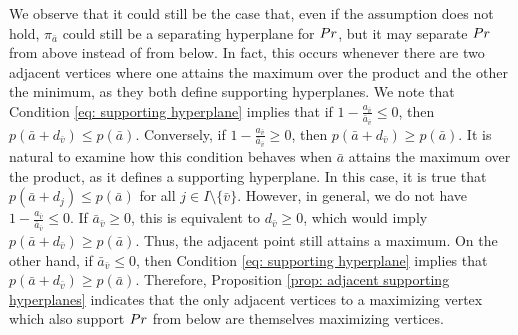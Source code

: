 \documentclass{article}
\begin{document}
We observe that it could still be the case that, even if the assumption does not hold, \(\pi_{\bar{a}}\) could still be a separating hyperplane for \(Pr\), but it may separate \(Pr\) from above instead of from below. In fact, this occurs whenever there are two adjacent vertices where one attains the maximum over the product and the other the minimum, as they both define supporting hyperplanes.
%
We note that Condition \eqref{eq: supporting hyperplane} implies that if \(1 - \frac{a_{\bar{v}}}{\bar{a}_{\bar{v}}} \leq 0\), then \(p(\bar{a} + d_{\bar{v}}) \leq p(\bar{a})\). Conversely, if \(1 - \frac{a_{\bar{v}}}{\bar{a}_{\bar{v}}} \geq 0\), then \(p(\bar{a} + d_{\bar{v}}) \geq p(\bar{a})\).
%
It is natural to examine how this condition behaves when \(\bar{a}\) attains the maximum over the product, as it defines a supporting hyperplane. In this case, it is true that \(p(\bar{a} + d_j) \leq p(\bar{a})\) for all \(j \in I \setminus \{\bar{v}\}\). However, in general, we do not have \(1 - \frac{a_{\bar{v}}}{\bar{a}_{\bar{v}}} \leq 0\). If \(\bar{a}_{\bar{v}} \geq 0\), this is equivalent to \(d_{\bar{v}} \geq 0\), which would imply \(p(\bar{a} + d_{\bar{v}}) \geq p(\bar{a})\). Thus, the adjacent point still attains a maximum.
%
On the other hand, if \(\bar{a}_{\bar{v}} \leq 0\), then Condition \eqref{eq: supporting hyperplane} implies that \(p(\bar{a} + d_{\bar{v}}) \geq p(\bar{a})\). Therefore, Proposition \ref{prop: adjacent supporting hyperplanes} indicates that the only adjacent vertices to a maximizing vertex which also support \(Pr\) from below are themselves maximizing vertices.
\end{document}
